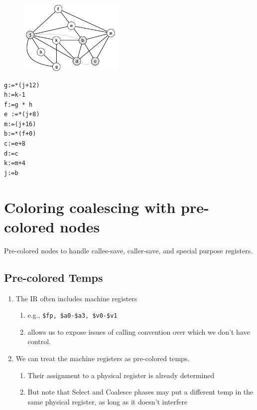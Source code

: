 \documentclass[a4paper]{exam}
\theoremstyle{definition}
\begin{document}
\begin{figure}[htbp]
  \centering
  \includegraphics[width=5cm]{./img/reg_example.png}
\end{figure}
\begin{verbatim}
g:=*(j+12)
h:=k-1
f:=g * h
e :=*(j+8)
m:=(j+16)
b:=*(f+0)
c:=e+8
d:=c
k:=m+4
j:=b
\end{verbatim}
\begin{solution}

\end{solution}
\section{Coloring coalescing with pre-colored nodes\cite{cs153lec21}}
Pre-colored nodes to handle callee-save, caller-save, and special purpose registers.
\subsection{Pre-colored Temps}
\begin{enumerate}
    \item The IR often includes machine registers
\begin{enumerate}
    \item e.g., \texttt{\$fp, \$a0-\$a3, \$v0-\$v1}
    \item allows us to expose issues of calling convention over which we don't have control.
\end{enumerate}
\item We can treat the machine registers as pre-colored temps.
\begin{enumerate}
    \item Their assignment to a physical register is already determined
    \item But note that Select and Coalesce phases may put a different temp in the same physical register, as long as it doesn't interfere
\end{enumerate}
\end{enumerate}
\end{document}

